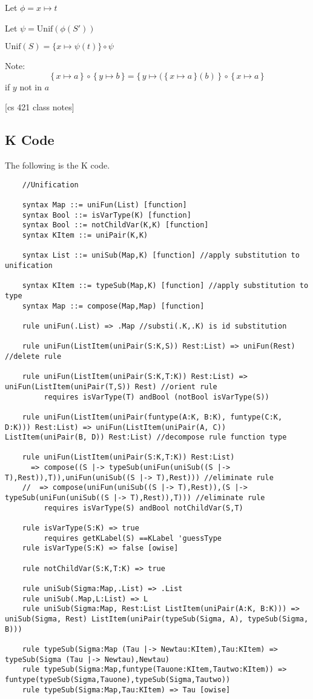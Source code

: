 Let $\phi = x \mapsto t$

Let $\psi = \text{Unif}(\phi(S'))$

$\text{Unif}(S) = \{x \mapsto \psi(t) \} \circ \psi$

Note: $$\{\, x \mapsto a \, \} \, \circ \, \{ \, y \mapsto b\,\} =
\{ \, y \mapsto (\,\{ \, x \mapsto a \, \} (b) \, \} \, \circ \, \{ \, x \mapsto a \, \}$$ if $y$ not
in $a$

[cs 421 class notes]

\subsection{K Code}

The following is the K code.
\begin{lstlisting}
    //Unification

    syntax Map ::= uniFun(List) [function]
    syntax Bool ::= isVarType(K) [function]
    syntax Bool ::= notChildVar(K,K) [function]
    syntax KItem ::= uniPair(K,K)

    syntax List ::= uniSub(Map,K) [function] //apply substitution to unification

    syntax KItem ::= typeSub(Map,K) [function] //apply substitution to type
    syntax Map ::= compose(Map,Map) [function]

    rule uniFun(.List) => .Map //substi(.K,.K) is id substitution

    rule uniFun(ListItem(uniPair(S:K,S)) Rest:List) => uniFun(Rest)  //delete rule

    rule uniFun(ListItem(uniPair(S:K,T:K)) Rest:List) => uniFun(ListItem(uniPair(T,S)) Rest) //orient rule
         requires isVarType(T) andBool (notBool isVarType(S))

    rule uniFun(ListItem(uniPair(funtype(A:K, B:K), funtype(C:K, D:K))) Rest:List) => uniFun(ListItem(uniPair(A, C)) ListItem(uniPair(B, D)) Rest:List) //decompose rule function type

    rule uniFun(ListItem(uniPair(S:K,T:K)) Rest:List) 
      => compose((S |-> typeSub(uniFun(uniSub((S |-> T),Rest)),T)),uniFun(uniSub((S |-> T),Rest))) //eliminate rule
    //  => compose(uniFun(uniSub((S |-> T),Rest)),(S |-> typeSub(uniFun(uniSub((S |-> T),Rest)),T))) //eliminate rule
         requires isVarType(S) andBool notChildVar(S,T)

    rule isVarType(S:K) => true
         requires getKLabel(S) ==KLabel 'guessType
    rule isVarType(S:K) => false [owise]

    rule notChildVar(S:K,T:K) => true

    rule uniSub(Sigma:Map,.List) => .List
    rule uniSub(.Map,L:List) => L
    rule uniSub(Sigma:Map, Rest:List ListItem(uniPair(A:K, B:K))) => uniSub(Sigma, Rest) ListItem(uniPair(typeSub(Sigma, A), typeSub(Sigma, B)))

    rule typeSub(Sigma:Map (Tau |-> Newtau:KItem),Tau:KItem) => typeSub(Sigma (Tau |-> Newtau),Newtau)
    rule typeSub(Sigma:Map,funtype(Tauone:KItem,Tautwo:KItem)) => funtype(typeSub(Sigma,Tauone),typeSub(Sigma,Tautwo))
    rule typeSub(Sigma:Map,Tau:KItem) => Tau [owise]
\end{lstlisting}
